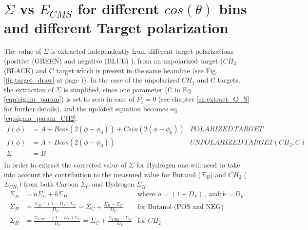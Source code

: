 \begin{figure}[htb]
\ContinuedFloat
  \begin{center} 
  \end{center}
\end{figure}

\clearpage
\newpage

\section{\texorpdfstring{$\Sigma$}{Sigma} vs \texorpdfstring{$E_{CMS}$}{E-CMS} for different \texorpdfstring{$cos(\theta)$}{cos(theta)} bins and different Target polarization}
\label{app:Sigma_TGPOL}
The value of $\Sigma$ is extracted independently from different target polarizations (positive (GREEN)  and negative (BLUE) ), from an unpolarized target ($CH_2$ (BLACK) and C target  which is present in the same beamline (see Fig. \ref{fig:target_draw} at page \pageref{fig:target_draw})). In the case of the unpolarized $CH_2$ and C targets, the extraction of $\Sigma$ is simplified, since one parameter (C in Eq. \ref{eqn:sigma_param}) is set to zero in case of $P_z=0$ (see chapter \ref{ch:extract_G_S} for further details), and the updated equation becomes eq. \ref{eq:sigma_param_CH2}. 
\begin{align}
  f(\phi) & = A + B cos(2(\phi-\phi_0)) + C sin(2(\phi-\phi_0)) & POLARIZED\, TARGET \label{eqn:sigma_param}\\
   f(\phi) & = A + B cos(2(\phi-\phi_0))  & UNPOLARIZED\, TARGET (CH_2 , C) \label{eq:sigma_param_CH2}\\
   \Sigma & = B & \\
\end{align}
In order to extract the corrected value of $\Sigma$ for Hydrogen one will need to take into account the contribution to the measured value for Butanol ($\Sigma_B$) and $CH_2$ ($\Sigma_{CH_2}$) from both Carbon $\Sigma_C$ and Hydrogen $\Sigma_H$.
\begin{align}
  \Sigma_B & = a \Sigma_C + b \Sigma_H  & \text{where:} \, a= (1-D_F) \,\text{, and:} \, b= D_F \label{eqn:sigma_calc_1}\\
  \Sigma_H & = \frac{\Sigma_B - (1-D_F)\Sigma_C}{D_F} = \Sigma_C + \frac{\Sigma_B - \Sigma_C}{D_F} & \text{for Butanol (POS and NEG)} \label{eq:sigma_calc_2}\\
  \Sigma_H & = \frac{\Sigma_{CH2} - (1-D_F)\Sigma_C}{D_F} = \Sigma_C + \frac{\Sigma_{CH2} - \Sigma_C}{D_F} & \text{for }CH_2 \label{eq:sigma_calc_3}\\ 
\end{align}
